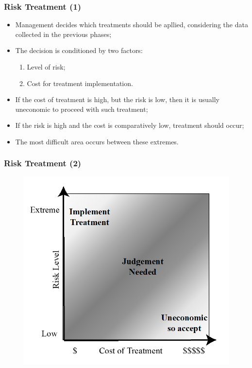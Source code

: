 \documentclass[xcolor ={table,usenames,dvipsnames}]{beamer}
\theoremstyle{definition}
\begin{document}
	\begin{frame}
		\frametitle{Risk Treatment (1)}	
		\begin{itemize}
			\item Management decides which treatments should be apllied, considering the data collected in the previous phases;
			\item The decision is conditioned by two factors:
			\begin{enumerate}
				\item Level of risk;
				\item Cost for treatment implementation.
			\end{enumerate}
			\item If the cost of treatment is high, but the risk is low, then it is usually uneconomic to proceed with such treatment; 
			\item If the risk is high and the cost is comparatively low, treatment should occur;
			\item The most difficult area occurs between these extremes. 
		\end{itemize}
	\end{frame}

	\begin{frame}
		\frametitle{Risk Treatment (2)}
		\begin{figure}[h!]
			\centering
			\includegraphics[scale=0.55]{img/img_13.PNG}
			\label{Interfacce di un CS}
		\end{figure}
	\end{frame}
	
\end{document}
